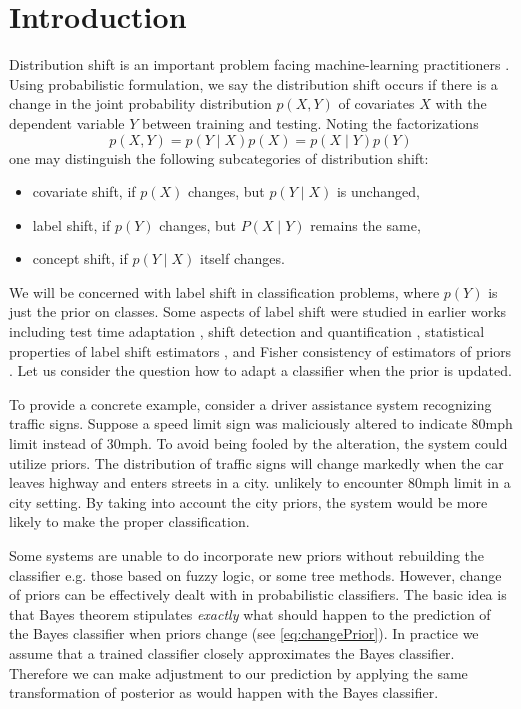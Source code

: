 \section{Introduction}



Distribution shift is an important problem facing machine-learning practitioners 
\cite{zhang2023dive, sugiyama2007covariate}.  Using probabilistic formulation, we say the distribution shift occurs if there is a change  in the joint probability distribution $p(X,Y)$ of covariates $X$ with the dependent variable $Y$  between training and testing. Noting the factorizations 
$$
p(X,Y) = p(Y\mid X)p(X) = p(X \mid Y )p(Y)
$$
one may distinguish the following subcategories of distribution shift:
\begin{itemize}
	\item covariate shift, if $p(X)$ changes, but $p(Y\mid X)$ is unchanged,
	\item label shift, if $p(Y)$ changes, but $P(X \mid Y)$ remains the same,
	\item concept shift, if $p(Y \mid X)$ itself changes.
\end{itemize}

We will be concerned with label shift in classification problems, where $p(Y)$ 
is just the prior on classes.  Some aspects of label shift were studied in
earlier works including test time adaptation
\cite{vsipka2022hitchhiker}, shift detection and quantification 
\cite{lipton2018detecting}, 
statistical properties of label shift estimators \cite{garg2020unified}, 
and Fisher consistency of estimators of priors \cite{tasche2017fisher}. 
Let us consider  the question 
how to adapt a classifier when the  prior is updated.

To provide a concrete example, consider a driver assistance system recognizing traffic signs. 
Suppose a speed limit sign was maliciously altered to indicate 80mph limit instead of 30mph.
To avoid being fooled by the alteration, the system could utilize priors.
The distribution of traffic signs will change markedly when the car leaves highway and enters streets in a city.
unlikely to encounter 80mph limit in a city setting. By taking into account 
the city priors, the system would be more likely to make the proper classification. 

Some systems are unable to do incorporate new priors without rebuilding 
the classifier  e.g. those based 
on fuzzy logic, or some tree methods. 
However, change of priors can be effectively dealt with in probabilistic 
classifiers. The basic idea is that Bayes theorem stipulates \emph{exactly} 
what should happen  to the prediction of the  Bayes classifier when priors 
change (see \eqref{eq:changePrior}).  In practice we assume that a trained 
classifier closely approximates the Bayes classifier. Therefore we can make 
adjustment to our prediction by applying the same transformation of posterior 
as would happen with the Bayes classifier. 

